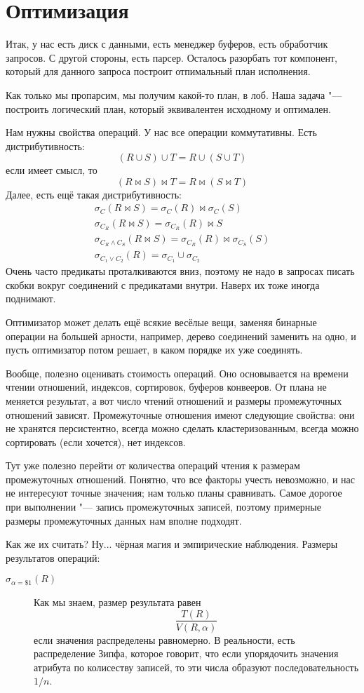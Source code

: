 \section{Оптимизация}

Итак, у нас есть диск с данными, есть менеджер буферов, есть обработчик запросов.
С другой стороны, есть парсер.
Осталось разорбать тот компонент, который для данного запроса построит отпимальный план исполнения.

Как только мы пропарсим, мы получим какой-то план, в лоб.
Наша задача "--- построить логический план, который эквивалентен исходному и оптимален.

Нам нужны свойства операций.
У нас все операции коммутативны.
Есть дистрибутивность:
\[ (R \cup S) \cup T = R \cup (S \cup T) \]
если имеет смысл, то
\[ (R \bowtie S) \bowtie T = R \bowtie (S \bowtie T) \]
Далее, есть ещё такая дистрибутивность:
\begin{gather*}
	\sigma_C (R \bowtie S) = \sigma_C(R) \bowtie \sigma_C(S) \\
	\sigma_{C_R} (R \bowtie S) = \sigma_{C_R}(R) \bowtie S \\
	\sigma_{C_R \land C_S} (R \bowtie S) = \sigma_{C_R}(R) \bowtie \sigma_{C_S}(S) \\
	\sigma_{C_1 \lor C_2} (R) = \sigma_{C_1} \cup \sigma_{C_2}
\end{gather*}
Очень часто предикаты проталкиваются вниз, поэтому не надо в запросах писать скобки вокруг соединений с предикатами внутри.
Наверх их тоже иногда поднимают.

Оптимизатор может делать ещё всякие весёлые вещи, заменяя бинарные операции на большей арности, например, дерево соединений заменить на одно, и пусть оптимизатор потом решает, в каком порядке их уже соединять.

Вообще, полезно оценивать стоимость операций.
Оно основывается на времени чтении отношений, индексов, сортировок, буферов конвееров.
От плана не меняется результат, а вот число чтений отношений и размеры промежуточных отношений зависят.
Промежуточные отношения имеют следующие свойства: они не хранятся персистентно, всегда можно сделать кластеризованным, всегда можно сортировать (если хочется), нет индексов.

Тут уже полезно перейти от количества операций чтения к размерам промежуточных отношений.
Понятно, что все факторы учесть невозможно, и нас не интересуют точные значения; нам только планы сравнивать.
Самое дорогое при выполнении "--- запись промежуточных записей, поэтому примерные размеры промежуточных данных нам вполне подходят.

Как же их считать? Ну... чёрная магия и эмпирические наблюдения.
Размеры результатов операций:
\begin{description}
\item[$\sigma_{\alpha = \$1}(R)$]
	Как мы знаем, размер результата равен
	\[ \frac{T(R)}{V(R, \alpha)} \]
	если значения распределены равномерно.
	В реальности, есть распределение Зипфа, которое говорит, что если упорядочить значения атрибута по колисеству записей, то эти числа образуют последовательность $1/n$.
\end{description}
